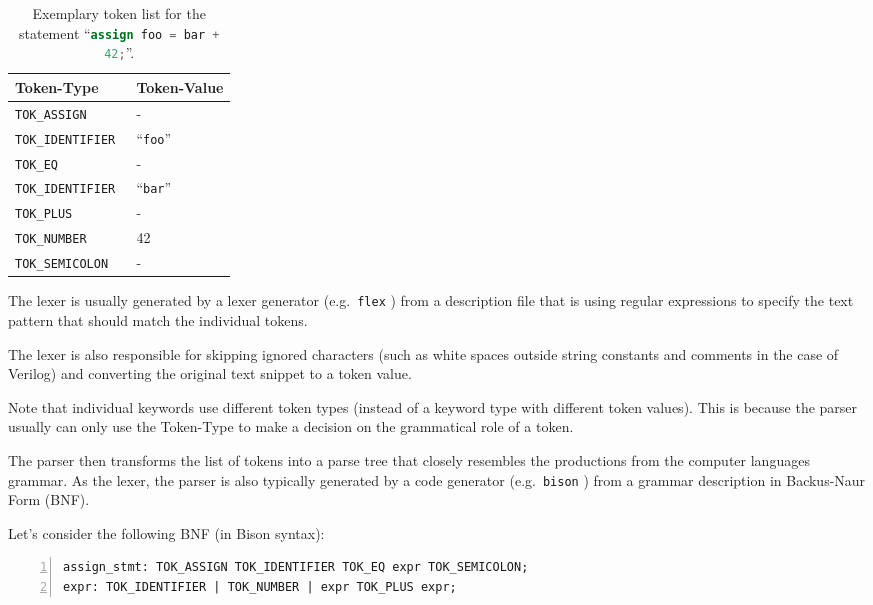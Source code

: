\begin{table}[t]
\hfil
\begin{tabular}{ll}
Token-Type & Token-Value \\
\hline
\tt TOK\_ASSIGN & - \\
\tt TOK\_IDENTIFIER & ``{\tt foo}'' \\
\tt TOK\_EQ & - \\
\tt TOK\_IDENTIFIER & ``{\tt bar}'' \\
\tt TOK\_PLUS & - \\
\tt TOK\_NUMBER & 42 \\
\tt TOK\_SEMICOLON & - \\
\end{tabular}
\caption{Exemplary token list for the statement ``\lstinline[language=Verilog]{assign foo = bar + 42;}''.}
\label{tab:Basics_tokens}
\end{table}

The lexer is usually generated by a lexer generator (e.g.~{\tt flex} ) from a
description file that is using regular expressions to specify the text pattern that should match
the individual tokens.

The lexer is also responsible for skipping ignored characters (such as white spaces outside string
constants and comments in the case of Verilog) and converting the original text snippet to a token
value.

Note that individual keywords use different token types (instead of a keyword type with different
token values). This is because the parser usually can only use the Token-Type to make a decision on
the grammatical role of a token.

The parser then transforms the list of tokens into a parse tree that closely resembles the productions
from the computer languages grammar. As the lexer, the parser is also typically generated by a code
generator (e.g.~{\tt bison} ) from a grammar description in Backus-Naur Form (BNF).

Let's consider the following BNF (in Bison syntax):

\begin{lstlisting}[numbers=left,frame=single]
assign_stmt: TOK_ASSIGN TOK_IDENTIFIER TOK_EQ expr TOK_SEMICOLON;
expr: TOK_IDENTIFIER | TOK_NUMBER | expr TOK_PLUS expr;
\end{lstlisting}

